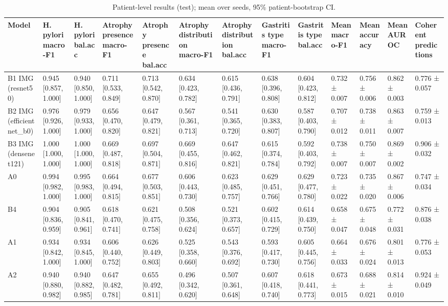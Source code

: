 \begin{table}
\caption{Patient-level results (test); mean over seeds, 95\% patient-bootstrap CI.}
\label{tab:table3_main}
\begin{tabular}{lllllllllllll}
\toprule
Model & H. pylori macro-F1 & H. pylori bal.acc & Atrophy presence macro-F1 & Atrophy presence bal.acc & Atrophy distribution macro-F1 & Atrophy distribution bal.acc & Gastritis type macro-F1 & Gastritis type bal.acc & Mean macro-F1 & Mean accuracy & Mean AUROC & Coherent predictions \\
\midrule
B1 IMG (resnet50) & 0.945 [0.857, 1.000] & 0.940 [0.850, 1.000] & 0.711 [0.533, 0.849] & 0.713 [0.542, 0.870] & 0.634 [0.423, 0.782] & 0.615 [0.436, 0.791] & 0.638 [0.396, 0.808] & 0.604 [0.423, 0.812] & 0.732 ± 0.007 & 0.756 ± 0.006 & 0.862 ± 0.003 & 0.776 ± 0.057 \\
B2 IMG (efficientnet\_b0) & 0.976 [0.926, 1.000] & 0.979 [0.933, 1.000] & 0.656 [0.470, 0.820] & 0.647 [0.479, 0.821] & 0.567 [0.361, 0.713] & 0.541 [0.365, 0.720] & 0.630 [0.383, 0.807] & 0.587 [0.403, 0.790] & 0.707 ± 0.012 & 0.738 ± 0.011 & 0.863 ± 0.007 & 0.759 ± 0.013 \\
B3 IMG (densenet121) & 1.000 [1.000, 1.000] & 1.000 [1.000, 1.000] & 0.669 [0.487, 0.818] & 0.697 [0.504, 0.871] & 0.669 [0.455, 0.816] & 0.647 [0.462, 0.821] & 0.615 [0.374, 0.784] & 0.592 [0.403, 0.792] & 0.738 ± 0.007 & 0.750 ± 0.007 & 0.869 ± 0.002 & 0.906 ± 0.032 \\
A0 & 0.994 [0.982, 1.000] & 0.995 [0.983, 1.000] & 0.664 [0.494, 0.815] & 0.677 [0.503, 0.851] & 0.606 [0.443, 0.730] & 0.623 [0.485, 0.757] & 0.629 [0.451, 0.766] & 0.629 [0.477, 0.780] & 0.723 ± 0.022 & 0.735 ± 0.020 & 0.867 ± 0.006 & 0.747 ± 0.034 \\
B4 & 0.904 [0.836, 0.959] & 0.905 [0.841, 0.961] & 0.618 [0.470, 0.741] & 0.621 [0.475, 0.758] & 0.508 [0.356, 0.624] & 0.521 [0.373, 0.657] & 0.602 [0.415, 0.729] & 0.614 [0.439, 0.750] & 0.658 ± 0.047 & 0.675 ± 0.048 & 0.772 ± 0.031 & 0.876 ± 0.038 \\
A1 & 0.934 [0.842, 1.000] & 0.934 [0.845, 1.000] & 0.606 [0.440, 0.752] & 0.626 [0.449, 0.803] & 0.525 [0.358, 0.660] & 0.543 [0.376, 0.692] & 0.593 [0.417, 0.730] & 0.605 [0.445, 0.756] & 0.664 ± 0.033 & 0.676 ± 0.024 & 0.801 ± 0.013 & 0.776 ± 0.053 \\
A2 & 0.940 [0.880, 0.982] & 0.940 [0.882, 0.985] & 0.647 [0.482, 0.781] & 0.655 [0.492, 0.811] & 0.496 [0.342, 0.620] & 0.507 [0.361, 0.648] & 0.607 [0.418, 0.740] & 0.618 [0.441, 0.773] & 0.673 ± 0.015 & 0.688 ± 0.021 & 0.814 ± 0.010 & 0.924 ± 0.049 \\

\end{tabular}
\end{table}
